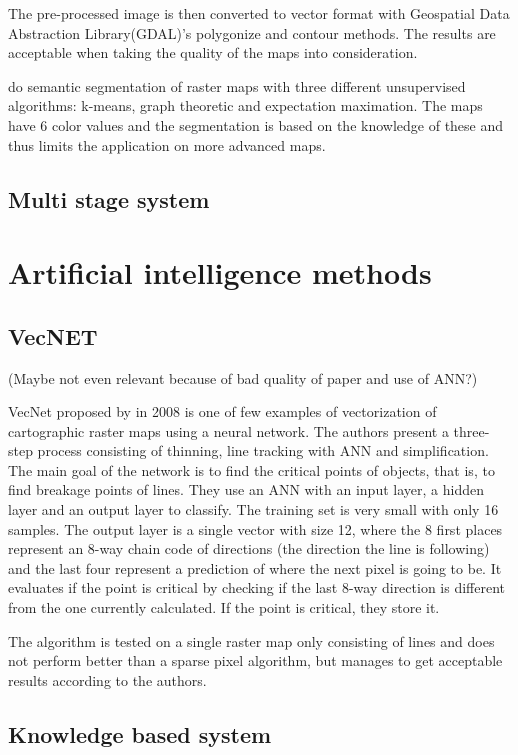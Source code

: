 The pre-processed image is then converted to vector format with Geospatial Data Abstraction Library\cite{OSGeo}(GDAL)'s polygonize and contour methods. The results are acceptable when taking the quality of the maps into consideration.

\citeauthor{Henderson} do semantic segmentation of raster maps with three different unsupervised algorithms: k-means, graph theoretic and expectation maximation. The maps have 6 color values and the segmentation is based on the knowledge of these and thus limits the application on more advanced maps.


\subsection{Multi stage system}
\cite{Oka2012}


\section{Artificial intelligence methods}

\subsection{VecNET}
(Maybe not even relevant because of bad quality of paper and use of ANN?)

VecNet proposed by \citeauthor{Karabork2008} in 2008 is one of few examples of vectorization of cartographic raster maps using a neural network. The authors present a three-step process consisting of thinning, line tracking with ANN and simplification. The main goal of the network is to find the critical points of objects, that is, to find breakage points of lines. They use an ANN with an input layer, a hidden layer and an output layer to classify. The training set is very small with only 16 samples. The output layer is a single vector with size 12, where the 8 first places represent an 8-way chain code of directions (the direction the line is following) and the last four represent a prediction of where the next pixel is going to be. It evaluates if the point is critical by checking if the last 8-way direction is different from the one currently calculated. If the point is critical, they store it.

The algorithm is tested on a single raster map only consisting of lines and does not perform better than a sparse pixel algorithm, but manages to get acceptable results according to the authors.

\subsection{Knowledge based system}
\cite{Lee2000}

\cite{Song2000}


